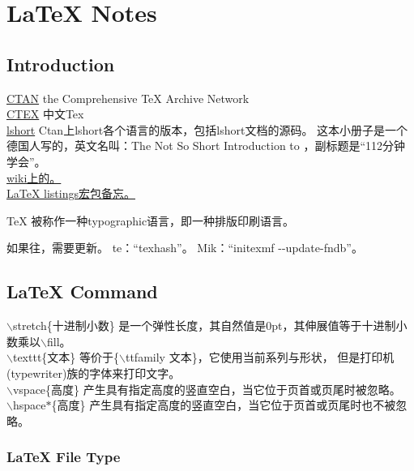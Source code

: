\chapter{\LaTeX{} Notes}
\index{\LaTeX}

\section{Introduction}
\noindent\href{http://www.ctan.org}{CTAN} the Comprehensive TeX Archive Network\\
\href{http://www.ctex.org}{CTEX} 中文Tex\\
\href{http://www.ctan.org/tex-archive/info/lshort/}{lshort} Ctan上lshort各个语言的版本，包括lshort文档的源码。
这本小册子是一个德国人写的，英文名叫：The Not So Short Introduction to \LaTeXe，副标题是``112分钟学会\LaTeXe''。\\
\href{http://en.wikibooks.org/wiki/LaTeX/Packages} {wiki上的。} \\
\href{http://blog.sina.com.cn/s/blog\_51e68f8d0100avil.html}{\LaTeX{} listings宏包备忘。}

\TeX{} 被称作一种typographic语言，即一种排版印刷语言。

如果往，需要更新。
te：``texhash''。
Mik：``initexmf -\mbox{}-update-fndb''。

\section{\LaTeX{} Command}
\noindent $\backslash$stretch\{十进制小数\} 是一个弹性长度，其自然值是0pt，其伸展值等于十进制小数乘以$\backslash$fill。\\
\noindent $\backslash$texttt\{文本\} 等价于\{$\backslash$ttfamily 文本\}，它使用当前系列与形状，
但是打印机(typewriter)族的字体来打印文字。\\
\noindent $\backslash$vspace\{高度\} 产生具有指定高度的竖直空白，当它位于页首或页尾时被忽略。\\
\noindent $\backslash$hspace$*$\{高度\} 产生具有指定高度的竖直空白，当它位于页首或页尾时也不被忽略。\\


\subsection{\LaTeX{} File Type}

